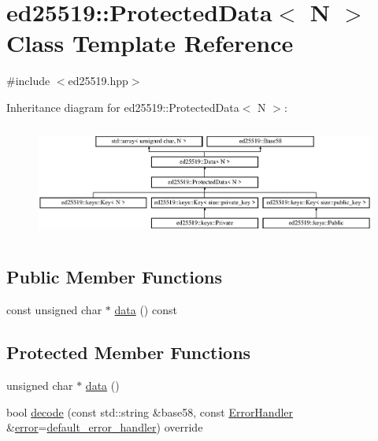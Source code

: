 \hypertarget{classed25519_1_1_protected_data}{}\section{ed25519\+:\+:Protected\+Data$<$ N $>$ Class Template Reference}
\label{classed25519_1_1_protected_data}


{\ttfamily \#include $<$ed25519.\+hpp$>$}

Inheritance diagram for ed25519\+:\+:Protected\+Data$<$ N $>$\+:\begin{figure}[H]
\begin{center}
\leavevmode
\includegraphics[height=3.778677cm]{classed25519_1_1_protected_data}
\end{center}
\end{figure}
\subsection*{Public Member Functions}
\begin{DoxyCompactItemize}
\item 
const unsigned char $\ast$ \mbox{\hyperlink{classed25519_1_1_protected_data_a4b550b14851e4553fff55e04bf052adf}{data}} () const
\end{DoxyCompactItemize}
\subsection*{Protected Member Functions}
\begin{DoxyCompactItemize}
\item 
unsigned char $\ast$ \mbox{\hyperlink{classed25519_1_1_protected_data_a4d95663d6cd6b4ec30c6d0969ca896e9}{data}} ()
\item 
bool \mbox{\hyperlink{classed25519_1_1_protected_data_a708852546126e7d19229e247b92a98f6}{decode}} (const std\+::string \&base58, const \mbox{\hyperlink{namespaceed25519_a6ba572942b3c18591fc869d52a6b16e6}{Error\+Handler}} \&\mbox{\hyperlink{namespaceed25519_ac93d0b5156eaca22197055e902920bc4}{error}}=\mbox{\hyperlink{namespaceed25519_a7c7bb6ed17541162959c33ed3e3b15fb}{default\+\_\+error\+\_\+handler}}) override
\end{DoxyCompactItemize}

